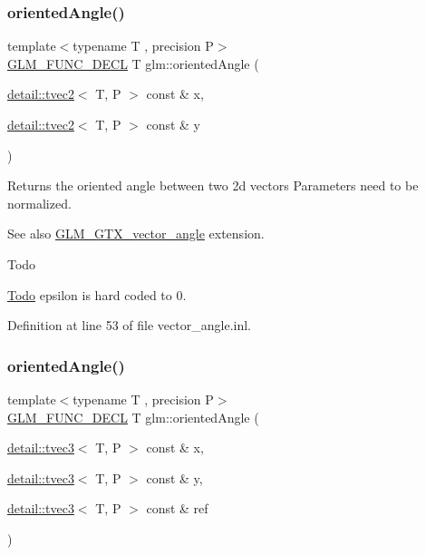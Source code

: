 \subsubsection{\texorpdfstring{oriented\+Angle()}{orientedAngle()}\hspace{0.1cm}{\footnotesize\ttfamily [1/2]}}
{\footnotesize\ttfamily template$<$typename T , precision P$>$ \\
\hyperlink{setup_8hpp_ab2d052de21a70539923e9bcbf6e83a51}{G\+L\+M\+\_\+\+F\+U\+N\+C\+\_\+\+D\+E\+CL} T glm\+::oriented\+Angle (\begin{DoxyParamCaption}\item[{\hyperlink{structglm_1_1detail_1_1tvec2}{detail\+::tvec2}$<$ T, P $>$ const \&}]{x,  }\item[{\hyperlink{structglm_1_1detail_1_1tvec2}{detail\+::tvec2}$<$ T, P $>$ const \&}]{y }\end{DoxyParamCaption})}

Returns the oriented angle between two 2d vectors Parameters need to be normalized. \begin{DoxySeeAlso}{See also}
\hyperlink{group__gtx__vector__angle}{G\+L\+M\+\_\+\+G\+T\+X\+\_\+vector\+\_\+angle} extension.
\end{DoxySeeAlso}
\begin{DoxyRefDesc}{Todo}
\item[\hyperlink{todo__todo000008}{Todo}]epsilon is hard coded to 0. \end{DoxyRefDesc}


Definition at line 53 of file vector\+\_\+angle.\+inl.

\mbox{\label{group__gtx__vector__angle_ga2aefc221dd5ed9fdacc17c28eea76775}} 
\subsubsection{\texorpdfstring{oriented\+Angle()}{orientedAngle()}\hspace{0.1cm}{\footnotesize\ttfamily [2/2]}}
{\footnotesize\ttfamily template$<$typename T , precision P$>$ \\
\hyperlink{setup_8hpp_ab2d052de21a70539923e9bcbf6e83a51}{G\+L\+M\+\_\+\+F\+U\+N\+C\+\_\+\+D\+E\+CL} T glm\+::oriented\+Angle (\begin{DoxyParamCaption}\item[{\hyperlink{structglm_1_1detail_1_1tvec3}{detail\+::tvec3}$<$ T, P $>$ const \&}]{x,  }\item[{\hyperlink{structglm_1_1detail_1_1tvec3}{detail\+::tvec3}$<$ T, P $>$ const \&}]{y,  }\item[{\hyperlink{structglm_1_1detail_1_1tvec3}{detail\+::tvec3}$<$ T, P $>$ const \&}]{ref }\end{DoxyParamCaption})}

